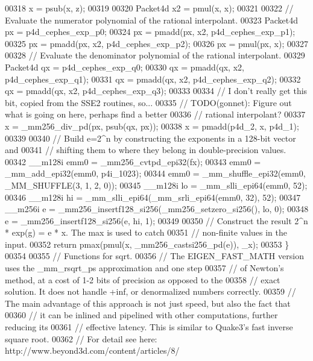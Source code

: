 \begin{DoxyCode}
00318   x = psub(x, z);
00319 
00320   Packet4d x2 = pmul(x, x);
00321 
00322   \textcolor{comment}{// Evaluate the numerator polynomial of the rational interpolant.}
00323   Packet4d px = p4d\_cephes\_exp\_p0;
00324   px = pmadd(px, x2, p4d\_cephes\_exp\_p1);
00325   px = pmadd(px, x2, p4d\_cephes\_exp\_p2);
00326   px = pmul(px, x);
00327 
00328   \textcolor{comment}{// Evaluate the denominator polynomial of the rational interpolant.}
00329   Packet4d qx = p4d\_cephes\_exp\_q0;
00330   qx = pmadd(qx, x2, p4d\_cephes\_exp\_q1);
00331   qx = pmadd(qx, x2, p4d\_cephes\_exp\_q2);
00332   qx = pmadd(qx, x2, p4d\_cephes\_exp\_q3);
00333 
00334   \textcolor{comment}{// I don't really get this bit, copied from the SSE2 routines, so...}
00335   \textcolor{comment}{// TODO(gonnet): Figure out what is going on here, perhaps find a better}
00336   \textcolor{comment}{// rational interpolant?}
00337   x = \_mm256\_div\_pd(px, psub(qx, px));
00338   x = pmadd(p4d\_2, x, p4d\_1);
00339 
00340   \textcolor{comment}{// Build e=2^n by constructing the exponents in a 128-bit vector and}
00341   \textcolor{comment}{// shifting them to where they belong in double-precision values.}
00342   \_\_m128i emm0 = \_mm256\_cvtpd\_epi32(fx);
00343   emm0 = \_mm\_add\_epi32(emm0, p4i\_1023);
00344   emm0 = \_mm\_shuffle\_epi32(emm0, \_MM\_SHUFFLE(3, 1, 2, 0));
00345   \_\_m128i lo = \_mm\_slli\_epi64(emm0, 52);
00346   \_\_m128i hi = \_mm\_slli\_epi64(\_mm\_srli\_epi64(emm0, 32), 52);
00347   \_\_m256i e = \_mm256\_insertf128\_si256(\_mm256\_setzero\_si256(), lo, 0);
00348   e = \_mm256\_insertf128\_si256(e, hi, 1);
00349 
00350   \textcolor{comment}{// Construct the result 2^n * exp(g) = e * x. The max is used to catch}
00351   \textcolor{comment}{// non-finite values in the input.}
00352   \textcolor{keywordflow}{return} pmax(pmul(x, \_mm256\_castsi256\_pd(e)), \_x);
00353 \}
00354 
00355 \textcolor{comment}{// Functions for sqrt.}
00356 \textcolor{comment}{// The EIGEN\_FAST\_MATH version uses the \_mm\_rsqrt\_ps approximation and one step}
00357 \textcolor{comment}{// of Newton's method, at a cost of 1-2 bits of precision as opposed to the}
00358 \textcolor{comment}{// exact solution. It does not handle +inf, or denormalized numbers correctly.}
00359 \textcolor{comment}{// The main advantage of this approach is not just speed, but also the fact that}
00360 \textcolor{comment}{// it can be inlined and pipelined with other computations, further reducing its}
00361 \textcolor{comment}{// effective latency. This is similar to Quake3's fast inverse square root.}
00362 \textcolor{comment}{// For detail see here: http://www.beyond3d.com/content/articles/8/}

\end{DoxyCode}
